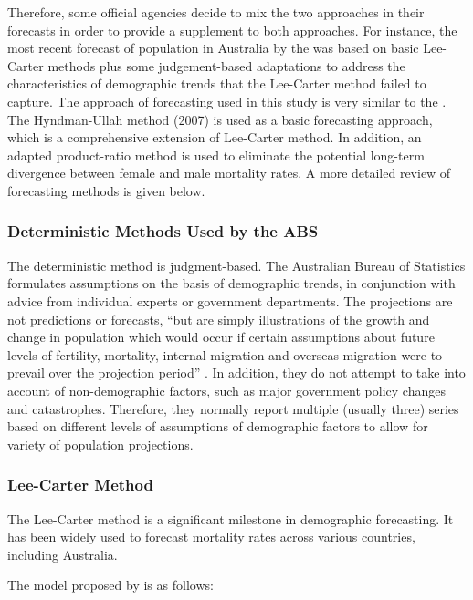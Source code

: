 \documentclass[11pt,a4paper,]{article}
\begin{document}
Therefore, some official agencies decide to mix the two approaches in
their forecasts in order to provide a supplement to both approaches. For
instance, the most recent forecast of population in Australia by the
\textcite{PC13} was based on basic Lee-Carter methods plus some
judgement-based adaptations to address the characteristics of
demographic trends that the Lee-Carter method failed to capture. The
approach of forecasting used in this study is very similar to the
\textcite{PC13}. The Hyndman-Ullah method (2007) is used as a basic
forecasting approach, which is a comprehensive extension of Lee-Carter
method. In addition, an adapted product-ratio method is used to
eliminate the potential long-term divergence between female and male
mortality rates. A more detailed review of forecasting methods is given
below.

\subsubsection{Deterministic Methods Used by the
ABS}\label{deterministic-methods-used-by-the-abs}

The deterministic method is judgment-based. The Australian Bureau of
Statistics formulates assumptions on the basis of demographic trends, in
conjunction with advice from individual experts or government
departments. The projections are not predictions or forecasts, ``but are
simply illustrations of the growth and change in population which would
occur if certain assumptions about future levels of fertility,
mortality, internal migration and overseas migration were to prevail
over the projection period'' \autocite[p.2]{ABS12}. In addition, they do
not attempt to take into account of non-demographic factors, such as
major government policy changes and catastrophes. Therefore, they
normally report multiple (usually three) series based on different
levels of assumptions of demographic factors to allow for variety of
population projections.

\subsubsection{Lee-Carter Method}\label{lee-carter-method}

The Lee-Carter method \autocite{LC92} is a significant milestone in
demographic forecasting. It has been widely used to forecast mortality
rates across various countries, including Australia.

The model proposed by \textcite{LC92} is as follows:
\end{document}
